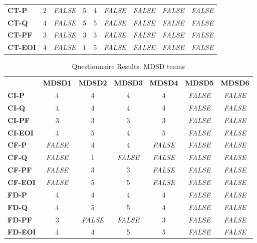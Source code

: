 \documentclass[final_report_innit.tex]{subfiles}
\begin{document}
\begin{center}
\begin{table}[h]
\begin{tabular}[b]{l | c | c | c | c | c | c | c | c}
	\textbf{CT-P} & 2 & \textit{FALSE} & 5 & 4 & \textit{FALSE} & \textit{FALSE} & \textit{FALSE} & \textit{FALSE} \\ %
	\textbf{CT-Q} & 4 & \textit{FALSE} & 5 & 5 & \textit{FALSE} & \textit{FALSE} & \textit{FALSE} & \textit{FALSE} \\ %
	\textbf{CT-PF} & 3 & \textit{FALSE} & 3 & 3 & \textit{FALSE} & \textit{FALSE} & \textit{FALSE} & \textit{FALSE} \\ %
	\textbf{CT-EOI} & 4 & \textit{FALSE} & 1 & 5 & \textit{FALSE} & \textit{FALSE} & \textit{FALSE} & \textit{FALSE} \\ %
\end{tabular}
\end{table}

\begin{table}
\caption{Questionnaire Results: MDSD teams}
\begin{tabular}[b]{l | c | c | c | c | c | c}
	& \textbf{MDSD1} & \textbf{MDSD2} & \textbf{MDSD3} & \textbf{MDSD4} & \textbf{MDSD5} & \textbf{MDSD6} \\ %
	\textbf{CI-P} & 4 & 4 & 4 & 4 & \textit{FALSE} & \textit{FALSE} \\ %
	\textbf{CI-Q} & 4 & 4 & 4 & 4 & \textit{FALSE} & \textit{FALSE} \\ %
	\textbf{CI-PF} & 3 & 3 & 3 & 3 & \textit{FALSE} & \textit{FALSE} \\ %
	\textbf{CI-EOI} & 4 & 5 & 4 & 5 & \textit{FALSE} & \textit{FALSE} \\ %
	\textbf{CF-P} & \textit{FALSE} & 4 & 4 & \textit{FALSE} & \textit{FALSE} & \textit{FALSE} \\ %
	\textbf{CF-Q} & \textit{FALSE} & 1 & \textit{FALSE} & \textit{FALSE} & \textit{FALSE} & \textit{FALSE} \\ %
	\textbf{CF-PF} & \textit{FALSE} & 3 & 3 & \textit{FALSE} & \textit{FALSE} & \textit{FALSE} \\ %
	\textbf{CF-EOI} & \textit{FALSE} & 5 & 5 & \textit{FALSE} & \textit{FALSE} & \textit{FALSE} \\ %
	\textbf{FD-P} & 4 & 4 & 4 & 4 & \textit{FALSE} & \textit{FALSE} \\ %
	\textbf{FD-Q} & 4 & 5 & 5 & 4 & \textit{FALSE} & \textit{FALSE} \\ %
	\textbf{FD-PF} & 3 & \textit{FALSE} & \textit{FALSE} & 3 & \textit{FALSE} & \textit{FALSE} \\ %
	\textbf{FD-EOI} & 4 & 4 & 5 & 5 & \textit{FALSE} & \textit{FALSE} \\ %

\end{tabular}
\end{table}
\end{center}
\end{document}
